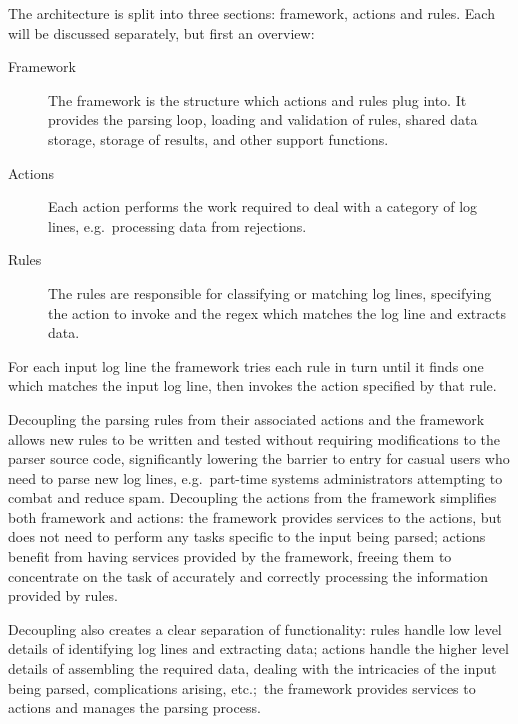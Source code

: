 \documentclass[draft]{svmult}
\begin{document}
\label{Architecture}

The architecture is split into three sections: framework, actions and
rules.  Each will be discussed separately, but first an overview:

\begin{description}

    \item [Framework]  The framework is the structure which actions and
        rules plug into.  It provides the parsing loop, loading and
        validation of rules, shared data storage, storage of results, and
        other support functions.

    \item [Actions]  Each action performs the work required to deal with a
        category of log lines, e.g.\ processing data from rejections.

    \item [Rules]  The rules are responsible for classifying or matching
        log lines, specifying the action to invoke and the regex which
        matches the log line and extracts data.

\end{description}

For each input log line the framework tries each rule in turn until it
finds one which matches the input log line, then invokes the action
specified by that rule.

Decoupling the parsing rules from their associated actions and the
framework allows new rules to be written and tested without requiring
modifications to the parser source code, significantly lowering the barrier
to entry for casual users who need to parse new log lines, e.g.\ part-time
systems administrators attempting to combat and reduce spam.  Decoupling
the actions from the framework simplifies both framework and actions: the
framework provides services to the actions, but does not need to perform
any tasks specific to the input being parsed; actions benefit from having
services provided by the framework, freeing them to concentrate on the task
of accurately and correctly processing the information provided by rules.

Decoupling also creates a clear separation of functionality: rules handle
low level details of identifying log lines and extracting data; actions
handle the higher level details of assembling the required data, dealing
with the intricacies of the input being parsed, complications arising,
etc.;\ the framework provides services to actions and manages the parsing
process.
\end{document}

